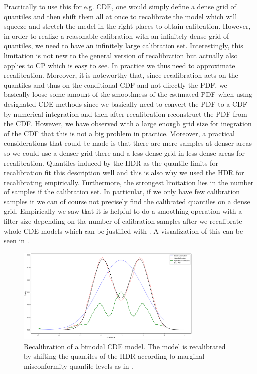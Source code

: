 Practically to use this for e.g. CDE, one would simply define a dense grid of quantiles and then shift them all at once to recalibrate the model which will squeeze and stretch the model in the right places to obtain calibration. However, in order to realize a reasonable calibration with an infinitely dense grid of quantiles, we need to have an infinitely large calibration set. Interestingly, this limitation is not new to the general version of recalibration but actually also applies to CP which is easy to see. In practice we thus need to approximate recalibration. Moreover, it is noteworthy that, since recalibration acts on the quantiles and thus on the conditional CDF and not directly the PDF, we basically loose some amount of the smoothness of the estimated PDF when using designated CDE methods since we basically need to convert the PDF to a CDF by numerical integration and then after recalibration reconstruct the PDF from the CDF. However, we have observed with a large enough grid size for inegration of the CDF that this is not a big problem in practice. Moreover, a practical considerations that could be made is that there are more samples at denser areas so we could use a denser grid there and a less dense grid in less dense areas for recalibration. Quantiles induced by the HDR as the quantile limits for recalibration fit this description well and this is also why we used the HDR for recalibrating empirically. Furthermore, the strongest limitation lies in the number of samples if the calibration set. In particular, if we only have few calibration samples it we can of course not precisely find the calibrated quantiles on a dense grid. Empirically we saw that it is helpful to do a smoothing operation with a filter size depending on the number of calibration samples after we recalibrate whole CDE models which can be justified with . A visualization of this can be seen in .

\begin{figure}
    \centering
    \includegraphics[width=0.8\textwidth]{resources/recalibration_bimodal_cde.png}
    \caption[Recalibration of a bimodal CDE model]{Recalibration of a bimodal CDE model. The model is recalibrated by shifting the quantiles of the HDR according to marginal misconformity quantile levels as in .}
    \label{fig:recalibration}
\end{figure}


